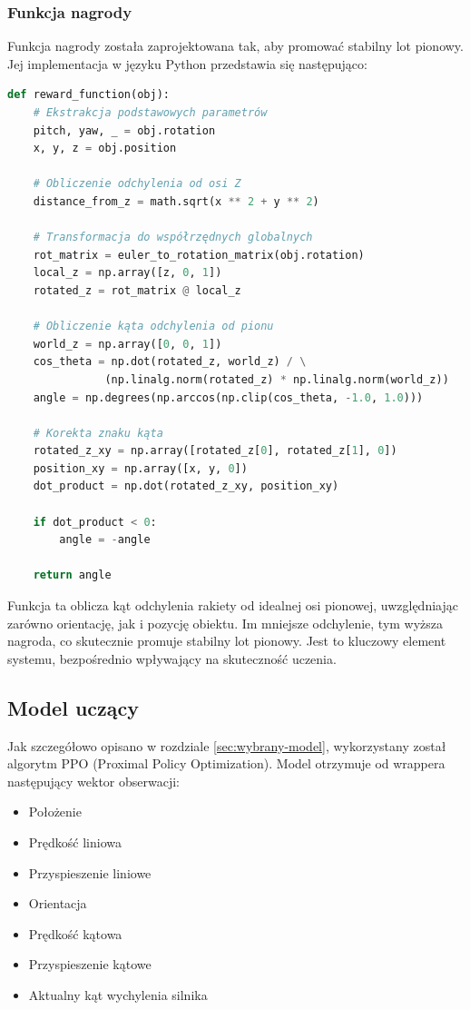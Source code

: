 \subsubsection{Funkcja nagrody}
\label{subsubsec:funkcja-nagrody}

Funkcja nagrody została zaprojektowana tak, aby promować stabilny lot pionowy. Jej implementacja w języku Python przedstawia się następująco:

\begin{lstlisting}[language=Python]
def reward_function(obj):
    # Ekstrakcja podstawowych parametrów
    pitch, yaw, _ = obj.rotation
    x, y, z = obj.position

    # Obliczenie odchylenia od osi Z
    distance_from_z = math.sqrt(x ** 2 + y ** 2)

    # Transformacja do współrzędnych globalnych
    rot_matrix = euler_to_rotation_matrix(obj.rotation)
    local_z = np.array([z, 0, 1])
    rotated_z = rot_matrix @ local_z

    # Obliczenie kąta odchylenia od pionu
    world_z = np.array([0, 0, 1])
    cos_theta = np.dot(rotated_z, world_z) / \
               (np.linalg.norm(rotated_z) * np.linalg.norm(world_z))
    angle = np.degrees(np.arccos(np.clip(cos_theta, -1.0, 1.0)))

    # Korekta znaku kąta
    rotated_z_xy = np.array([rotated_z[0], rotated_z[1], 0])
    position_xy = np.array([x, y, 0])
    dot_product = np.dot(rotated_z_xy, position_xy)

    if dot_product < 0:
        angle = -angle

    return angle
\end{lstlisting}

Funkcja ta oblicza kąt odchylenia rakiety od idealnej osi pionowej, uwzględniając zarówno orientację, jak i pozycję obiektu. Im mniejsze odchylenie, tym wyższa nagroda, co skutecznie promuje stabilny lot pionowy. Jest to kluczowy element systemu, bezpośrednio wpływający na skuteczność uczenia.

\subsection{Model uczący}
\label{subsec:model-uczacy}

Jak szczegółowo opisano w rozdziale \ref{sec:wybrany-model}, wykorzystany został algorytm PPO (Proximal Policy Optimization). Model otrzymuje od wrappera następujący wektor obserwacji:

\begin{itemize}
    \item Położenie
    \item Prędkość liniowa
    \item Przyspieszenie liniowe
    \item Orientacja
    \item Prędkość kątowa
    \item Przyspieszenie kątowe
    \item Aktualny kąt wychylenia silnika
\end{itemize}

